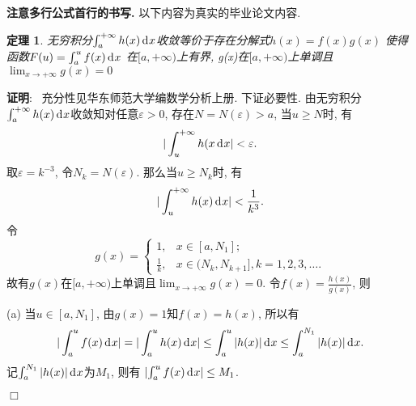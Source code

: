\documentclass[a4paper,12pt,hyperref,twoside]{ctexart}
\newcommand{\dev}[2][]{{\,\textup{d}}^{#1}#2}   %
\newtheorem{thm}{\phantom{参数}定理}[section] %
\numberwithin{equation}{section}
\newenvironment{proof}[1][\indent 证明]
    {\textbf {#1}:~}
    {\hfill $\Box$}
\begin{document}
\textbf{注意多行公式首行的书写.} 以下内容为真实的毕业论文内容.
\begin{thm}\label{theowom}
无穷积分$\int_{a}^{+\infty}{h(x)\dev x}$收敛等价于存在分解式$h(x)=f(x)g(x)$ 使得
函数$F(u)=\int_{a}^{u}{f(x)\dev x}$
在$[a, +\infty)$上有界, g(x)在$[a, +\infty)$上单调且$\displaystyle\lim_{x\to+\infty}g(x)=0$
\end{thm}
\begin{proof}
充分性见华东师范大学编数学分析上册. 下证必要性.
由无穷积分$\int_{a}^{+\infty}{h(x)\dev x}$收敛知对任意$\varepsilon>0$, 存在$N=N(\varepsilon)>a$, 当$u\ge N$时, 有
    $$\vert\int_u^{+\infty}h(x\dev x\vert<\varepsilon.$$
取$\varepsilon=k^{-3}$, 令$N_k=N(\varepsilon)$.  那么当$u\ge N_k$时, 有
    $$\vert\int_u^{+\infty}h(x)\dev x\vert<\frac{1}{k^3}.$$
令
$$
g(x)=\begin{cases}
1,&x\in[a, N_1];\\
\frac{1}{k},&x\in(N_k, N_{k+1}], k=1,2,3,\dots.
\end{cases}
$$
故有$g(x)$在$[a, +\infty)$上单调且$\displaystyle\lim_{x\to+\infty}g(x)=0$. 令$f(x)=\frac{h(x)}{g(x)}$, 则

(a) 当$u\in[a, N_1]$, 由$g(x)=1$知$f(x)=h(x)$, 所以有
$$\vert\int_{a}^{u}{f(x)\dev x}\vert=\vert\int_{a}^{u}{h(x)\dev x}\vert \le\int_{a}^{u}\vert{h(x)}\vert\dev x\le\int_{a}^{N_1}\vert h(x)\vert\dev x.$$
记$\int_{a}^{N_1}\vert h(x)\vert\dev x$为$ M_1$, 则有 ${\vert{\int_{a}^{u}{f(x)\dev x}}\vert}\leq M_1$.


\end{proof}
\end{document}
